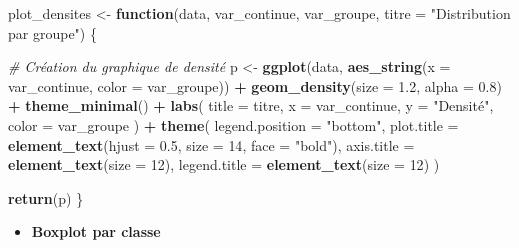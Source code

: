 \documentclass[
  12pt,
]{article}
\newenvironment{Shaded}{\begin{snugshade}}{\end{snugshade}}
\newcommand{\AttributeTok}[1]{\textcolor[rgb]{0.13,0.29,0.53}{#1}}
\newcommand{\CommentTok}[1]{\textcolor[rgb]{0.56,0.35,0.01}{\textit{#1}}}
\newcommand{\ControlFlowTok}[1]{\textcolor[rgb]{0.13,0.29,0.53}{\textbf{#1}}}
\newcommand{\DecValTok}[1]{\textcolor[rgb]{0.00,0.00,0.81}{#1}}
\newcommand{\FloatTok}[1]{\textcolor[rgb]{0.00,0.00,0.81}{#1}}
\newcommand{\FunctionTok}[1]{\textcolor[rgb]{0.13,0.29,0.53}{\textbf{#1}}}
\newcommand{\NormalTok}[1]{#1}
\newcommand{\OtherTok}[1]{\textcolor[rgb]{0.56,0.35,0.01}{#1}}
\newcommand{\SpecialCharTok}[1]{\textcolor[rgb]{0.81,0.36,0.00}{\textbf{#1}}}
\newcommand{\StringTok}[1]{\textcolor[rgb]{0.31,0.60,0.02}{#1}}
\providecommand{\tightlist}{%
  \setlength{\itemsep}{0pt}\setlength{\parskip}{0pt}}
\begin{document}
\begin{Shaded}
\begin{Highlighting}[]
\NormalTok{plot\_densites }\OtherTok{\textless{}{-}} \ControlFlowTok{function}\NormalTok{(data, var\_continue, var\_groupe, }
                          \AttributeTok{titre =} \StringTok{"Distribution par groupe"}\NormalTok{) \{}
  
  \CommentTok{\# Création du graphique de densité}
\NormalTok{  p }\OtherTok{\textless{}{-}} \FunctionTok{ggplot}\NormalTok{(data, }\FunctionTok{aes\_string}\NormalTok{(}\AttributeTok{x =}\NormalTok{ var\_continue, }\AttributeTok{color =}\NormalTok{ var\_groupe)) }\SpecialCharTok{+}
    \FunctionTok{geom\_density}\NormalTok{(}\AttributeTok{size =} \FloatTok{1.2}\NormalTok{, }\AttributeTok{alpha =} \FloatTok{0.8}\NormalTok{) }\SpecialCharTok{+}
    \FunctionTok{theme\_minimal}\NormalTok{() }\SpecialCharTok{+}
    \FunctionTok{labs}\NormalTok{(}
      \AttributeTok{title =}\NormalTok{ titre,}
      \AttributeTok{x =}\NormalTok{ var\_continue,}
      \AttributeTok{y =} \StringTok{"Densité"}\NormalTok{,}
      \AttributeTok{color =}\NormalTok{ var\_groupe}
\NormalTok{    ) }\SpecialCharTok{+}
    \FunctionTok{theme}\NormalTok{(}
      \AttributeTok{legend.position =} \StringTok{"bottom"}\NormalTok{,}
      \AttributeTok{plot.title =} \FunctionTok{element\_text}\NormalTok{(}\AttributeTok{hjust =} \FloatTok{0.5}\NormalTok{, }\AttributeTok{size =} \DecValTok{14}\NormalTok{, }\AttributeTok{face =} \StringTok{"bold"}\NormalTok{),}
      \AttributeTok{axis.title =} \FunctionTok{element\_text}\NormalTok{(}\AttributeTok{size =} \DecValTok{12}\NormalTok{),}
      \AttributeTok{legend.title =} \FunctionTok{element\_text}\NormalTok{(}\AttributeTok{size =} \DecValTok{12}\NormalTok{)}
\NormalTok{    )}
  
  \FunctionTok{return}\NormalTok{(p)}
\NormalTok{\}}
\end{Highlighting}
\end{Shaded}

\begin{itemize}
\tightlist
\item
  \textbf{Boxplot par classe}
\end{itemize}
\end{document}
